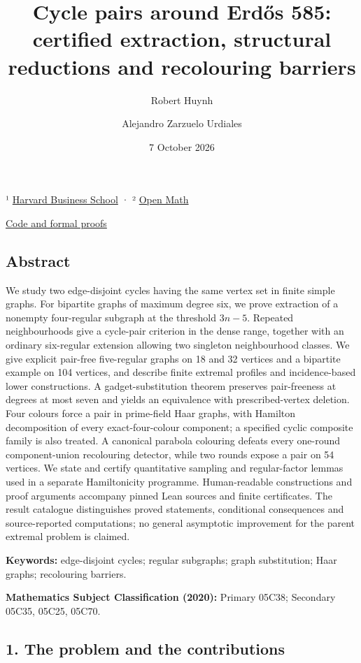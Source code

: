 \documentclass[
  11pt,
]{article}
\title{Cycle pairs around Erdős 585: certified extraction, structural
reductions and recolouring barriers}
\author{Robert Huynh \and Alejandro Zarzuelo Urdiales}
\date{7 October 2026}
\newcounter{none} %
\begin{document}
\maketitle

¹ \href{https://www.hbs.edu/}{Harvard Business School} · ²
\href{https://rsihouse.ai/openmath}{Open Math}

\href{https://github.com/alejandrozu/openmath-2026-judging/tree/70c5ec3107658182f22c207d4c50f53f9cb3e602/robert-review-2026-10-07}{Code
and formal proofs}

\subsection{Abstract}\label{abstract}

We study two edge-disjoint cycles having the same vertex set in finite
simple graphs. For bipartite graphs of maximum degree six, we prove
extraction of a nonempty four-regular subgraph at the threshold
\(3n-5\). Repeated neighbourhoods give a cycle-pair criterion in the
dense range, together with an ordinary six-regular extension allowing
two singleton neighbourhood classes. We give explicit pair-free
five-regular graphs on 18 and 32 vertices and a bipartite example on 104
vertices, and describe finite extremal profiles and incidence-based
lower constructions. A gadget-substitution theorem preserves
pair-freeness at degrees at most seven and yields an equivalence with
prescribed-vertex deletion. Four colours force a pair in prime-field
Haar graphs, with Hamilton decomposition of every exact-four-colour
component; a specified cyclic composite family is also treated. A
canonical parabola colouring defeats every one-round component-union
recolouring detector, while two rounds expose a pair on 54 vertices. We
state and certify quantitative sampling and regular-factor lemmas used
in a separate Hamiltonicity programme. Human-readable constructions and
proof arguments accompany pinned Lean sources and finite certificates.
The result catalogue distinguishes proved statements, conditional
consequences and source-reported computations; no general asymptotic
improvement for the parent extremal problem is claimed.

\textbf{Keywords:} edge-disjoint cycles; regular subgraphs; graph
substitution; Haar graphs; recolouring barriers.

\textbf{Mathematics Subject Classification (2020):} Primary 05C38;
Secondary 05C35, 05C25, 05C70.

\subsection{1. The problem and the
contributions}\label{the-problem-and-the-contributions}
\end{document}
